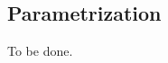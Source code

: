 \documentclass[
thesis.tex
]{subfiles}
\begin{document}
	
	\newpage
	
\subsection{Parametrization}

To be done.
\end{document}
